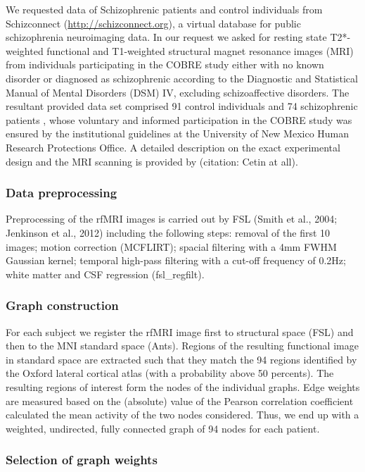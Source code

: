 \documentclass[\ifafour a4paper,12pt,\else a5paper,10pt,\fi%
onecolumn,oneside,article,%
british%
]{memoir}
\theoremstyle{remark}
\theoremstyle{innote}
\renewcommand*{\|}{\mathpunct{|}}
\theoremstyle{plain}
\begin{document}
We requested data of Schizophrenic patients and control individuals from
Schizconnect (\url{http://schizconnect.org}), a virtual database for public
schizophrenia neuroimaging data. In our request we asked for resting state
T2{*}-weighted functional and T1-weighted structural magnet resonance
images (MRI) from individuals participating in the COBRE study either with
no known disorder or diagnosed as schizophrenic according to the Diagnostic
and Statistical Manual of Mental Disorders (DSM) IV, excluding
schizoaffective disorders. The resultant provided data set comprised 91
control individuals and 74 schizophrenic patients , whose voluntary and
informed participation in the COBRE study was ensured by the institutional
guidelines at the University of New Mexico Human Research Protections
Office. A detailed description on the exact experimental design and the MRI
scanning is provided by (citation: Cetin at all).

\subsubsection{Data preprocessing}

Preprocessing of the rfMRI images is carried out by FSL (Smith et
al., 2004; Jenkinson et al., 2012) including the following steps:
removal of the first 10 images; motion correction (MCFLIRT); spacial
filtering with a 4mm FWHM Gaussian kernel; temporal high-pass filtering
with a cut-off frequency of 0.2Hz; white matter and CSF regression
(fsl\_regfilt).

\subsubsection*{Graph construction}

For each subject we register the rfMRI image first to structural space
(FSL) and then to the MNI standard space (Ants). Regions of the resulting
functional image in standard space are extracted such that they match
the 94 regions identified by the Oxford lateral cortical atlas (with
a probability above 50 percents). The resulting regions of interest
form the nodes of the individual graphs. Edge weights are measured
based on the (absolute) value of the Pearson correlation coefficient
calculated the mean activity of the two nodes considered. Thus, we
end up with a weighted, undirected, fully connected graph of 94 nodes
for each patient. 

\subsubsection*{Selection of graph weights}
\end{document}

